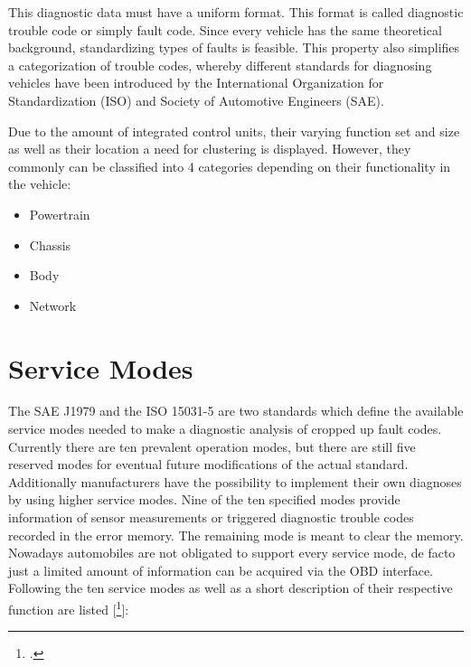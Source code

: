 This diagnostic data must have a uniform format. This format is called diagnostic trouble code or simply fault code. Since every 
vehicle has the same theoretical background, standardizing types of faults is feasible. This property also simplifies a categorization 
of trouble codes, whereby different standards for diagnosing vehicles have been introduced by the International Organization for 
Standardization (ISO) and Society of Automotive Engineers (SAE). 

Due to the amount of integrated control units, their varying function set and size as well as their location a need for clustering is 
displayed. However, they commonly can be classified into 4 categories depending on their functionality in the vehicle:
\begin{itemize}
 \item Powertrain 
 \item Chassis 
 \item Body 
 \item Network
\end{itemize}

\section{Service Modes}

The SAE J1979 and the ISO 15031-5 are two standards which define the available service modes needed to make a diagnostic analysis of cropped up fault codes. Currently there are ten prevalent operation modes, but there are still five reserved modes for eventual future modifications of the actual standard. Additionally manufacturers have the possibility to implement their own diagnoses by using higher service modes.
Nine of the ten specified modes provide information of sensor measurements or triggered diagnostic trouble codes recorded in the error memory. The remaining mode is meant to clear the memory. Nowadays automobiles are not obligated to support every service  mode, de facto just a limited amount of information can be acquired via the OBD interface.
Following the ten service modes as well as a short description of their respective function are listed [\footcite{SCHAFOBD2}]:


